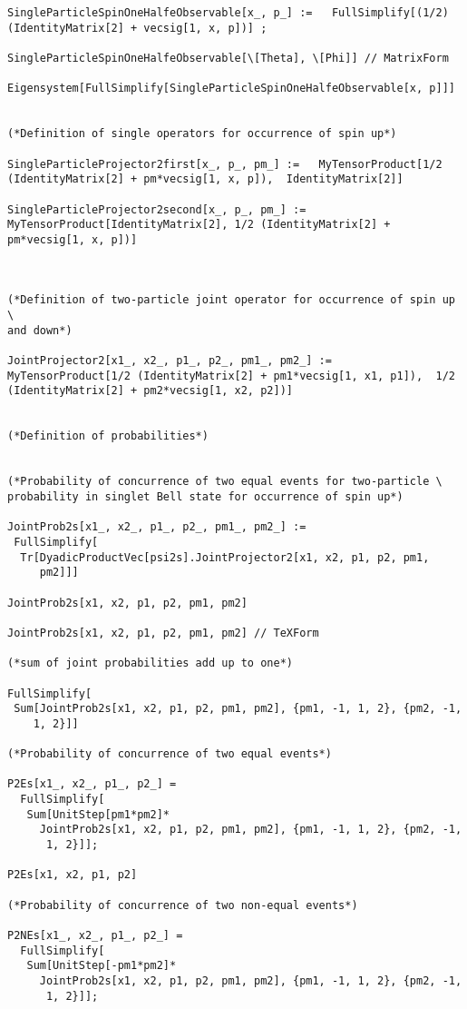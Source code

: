 \documentclass[%
  twocolumn,
 showpacs,
 showkeys,
 preprintnumbers,
 amsmath,amssymb,
 aps,
  pra,
  longbibliography,
 floatfix,
 ]{revtex4-1}
\begin{document}
{\begin{lstlisting}[backgroundcolor=\color{yellow!10},framerule=0pt,breaklines=true, frame=tb]
SingleParticleSpinOneHalfeObservable[x_, p_] :=   FullSimplify[(1/2) (IdentityMatrix[2] + vecsig[1, x, p])] ;

SingleParticleSpinOneHalfeObservable[\[Theta], \[Phi]] // MatrixForm

Eigensystem[FullSimplify[SingleParticleSpinOneHalfeObservable[x, p]]]


(*Definition of single operators for occurrence of spin up*)

SingleParticleProjector2first[x_, p_, pm_] :=   MyTensorProduct[1/2 (IdentityMatrix[2] + pm*vecsig[1, x, p]),  IdentityMatrix[2]]

SingleParticleProjector2second[x_, p_, pm_] :=  MyTensorProduct[IdentityMatrix[2], 1/2 (IdentityMatrix[2] + pm*vecsig[1, x, p])]



(*Definition of two-particle joint operator for occurrence of spin up \
and down*)

JointProjector2[x1_, x2_, p1_, p2_, pm1_, pm2_] :=  MyTensorProduct[1/2 (IdentityMatrix[2] + pm1*vecsig[1, x1, p1]),  1/2 (IdentityMatrix[2] + pm2*vecsig[1, x2, p2])]


(*Definition of probabilities*)


(*Probability of concurrence of two equal events for two-particle \
probability in singlet Bell state for occurrence of spin up*)

JointProb2s[x1_, x2_, p1_, p2_, pm1_, pm2_] :=
 FullSimplify[
  Tr[DyadicProductVec[psi2s].JointProjector2[x1, x2, p1, p2, pm1,
     pm2]]]

JointProb2s[x1, x2, p1, p2, pm1, pm2]

JointProb2s[x1, x2, p1, p2, pm1, pm2] // TeXForm

(*sum of joint probabilities add up to one*)

FullSimplify[
 Sum[JointProb2s[x1, x2, p1, p2, pm1, pm2], {pm1, -1, 1, 2}, {pm2, -1,
    1, 2}]]

(*Probability of concurrence of two equal events*)

P2Es[x1_, x2_, p1_, p2_] =
  FullSimplify[
   Sum[UnitStep[pm1*pm2]*
     JointProb2s[x1, x2, p1, p2, pm1, pm2], {pm1, -1, 1, 2}, {pm2, -1,
      1, 2}]];

P2Es[x1, x2, p1, p2]

(*Probability of concurrence of two non-equal events*)

P2NEs[x1_, x2_, p1_, p2_] =
  FullSimplify[
   Sum[UnitStep[-pm1*pm2]*
     JointProb2s[x1, x2, p1, p2, pm1, pm2], {pm1, -1, 1, 2}, {pm2, -1,
      1, 2}]];


\end{lstlisting}}
\end{document}
